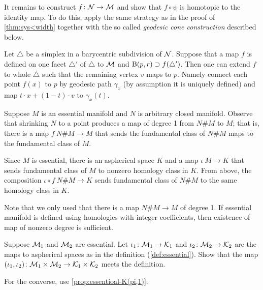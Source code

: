 It remains to construct $f\colon\mathcal{N}\to\mathcal{M}$ and show that $f\circ\psi$ is homotopic to the identity map.
To do this, apply the same strategy as in the proof of \ref{thm:sys<width} together with the so called \emph{geodesic cone construction}
described below.

Let $\triangle$ be a simplex in a barycentric subdivision of $\mathcal{N}$.
Suppose that a map $f$ is defined on one facet $\triangle'$ of $\triangle$ to $\mathcal{M}$ and $\mathrm{B}{}(p,r)\supset f(\triangle')$.
Then one can extend $f$ to whole $\triangle$ such that the remaining vertex $v$ maps to $p$.
Namely connect each point $f(x)$ to $p$ by geodesic path $\gamma_x$ (by assumption it is uniquely defined) and map $t\cdot x+(1-t)\cdot v$ to $\gamma_x(t)$.
  

Suppose $M$ is an essential manifold and $N$ is arbitrary closed manifold.
Observe that shrinking $N$ to a point produces a map of degree 1 from $N\#M$ to $M$; that is, there is a map $f\:N\#M\to M$ that sends the fundamental class of $N\#M$ maps to the fundamental class of $M$.

Since $M$ is essential, there is an aspherical space $K$ and a map $\iota\:M\to K$ that sends fundamental class of $M$ to nonzero homology class in $K$.
From above, the composition $\iota\circ f\:N\#M\to K$ sends fundamental class of $N\#M$ to the same homology class in $K$.

 Note that we only used that there is a map $N\#M\to M$ of degree 1. If essential manifold is defined using homologies with integer coefficients, then existence of map of nonzero degree is sufficient.

Suppose $\mathcal{M}_1$ and $\mathcal{M}_2$ are essential.
Let $\iota_1\colon\mathcal{M}_1\to\mathcal{K}_1$ and $\iota_2\colon\mathcal{M}_2\to\mathcal{K}_2$ are the maps to aspherical spaces as in the definition (\ref{def:essential}).
Show that the map
$(\iota_1,\iota_2)\colon\mathcal{M}_1\times\mathcal{M}_2\to\mathcal{K}_1\times\mathcal{K}_2$
meets the definition.

For the converse, use \ref{prop:essentioal-K(pi,1)}.

